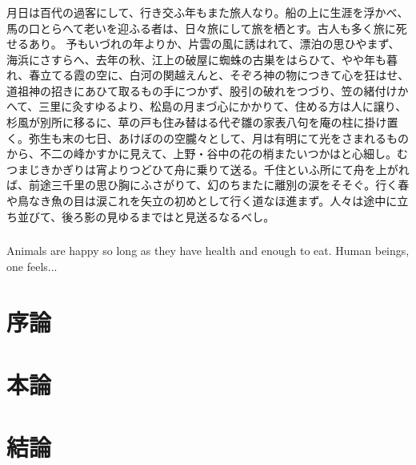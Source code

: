 \documentclass[a4j,12pt,twoside,openany]{jreport}
\begin{document}
% 

\vspace{10mm}
\newpage
\thispagestyle{empty}

\section*{\fontsize{14pt}{9pt}}
月日は百代の過客にして、行き交ふ年もまた旅人なり。船の上に生涯を浮かべ、馬の口とらへて老いを迎ふる者は、日々旅にして旅を栖とす。古人も多く旅に死せるあり。
予もいづれの年よりか、片雲の風に誘はれて、漂泊の思ひやまず、海浜にさすらへ、去年の秋、江上の破屋に蜘蛛の古巣をはらひて、やや年も暮れ、春立てる霞の空に、白河の関越えんと、そぞろ神の物につきて心を狂はせ、道祖神の招きにあひて取るもの手につかず、股引の破れをつづり、笠の緒付けかへて、三里に灸すゆるより、松島の月まづ心にかかりて、住める方は人に譲り、杉風が別所に移るに、草の戸も住み替はる代ぞ雛の家表八句を庵の柱に掛け置く。弥生も末の七日、あけぼのの空朧々として、月は有明にて光をさまれるものから、不二の峰かすかに見えて、上野・谷中の花の梢またいつかはと心細し。むつまじきかぎりは宵よりつどひて舟に乗りて送る。千住といふ所にて舟を上がれば、前途三千里の思ひ胸にふさがりて、幻のちまたに離別の涙をそそぐ。行く春や鳥なき魚の目は涙これを矢立の初めとして行く道なほ進まず。人々は途中に立ち並びて、後ろ影の見ゆるまではと見送るなるべし。

\newpage
\thispagestyle{empty}

\section*{\fontsize{14pt}{9pt}}
Animals are happy so long as they have health and
enough to eat. Human beings, one feels...

\newpage
\tableofcontents
\clearpage

\newpage
\part{序論}


\part{本論}


\part{結論}
\end{document}
